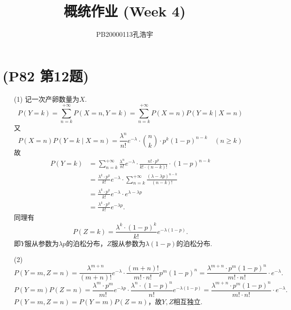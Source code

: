 \documentclass{article}
\title{概统作业 (Week 4)}
\author{PB20000113孔浩宇}
\begin{document}
\maketitle
\section{(P82 第12题)}  %
\begin{enumerate}
    \item [(1)]记一次产卵数量为$X$.
    \[
        P(Y=k) 
        =
        \sum\limits_{n=k}^{+\infty} P(X=n , Y=k) 
        =
        \sum\limits_{n=k}^{+\infty} P(X=n) P(Y=k \mid X=n)
    \]
    又
    \[
        P(X=n) P(Y=k \mid X=n)
        =
        \displaystyle{\frac{\lambda^n}{n!}} e^{-\lambda}\cdot
        \binom{n}{k} \cdot p^{k} {(1-p)}^{n-k}
        \quad (n\geq k)
    \]
    故
    \begin{align*}
        P(Y=k)
        &=
        \sum\limits_{n=k}^{+\infty} 
        \displaystyle{\frac{\lambda^n}{n!}} e^{-\lambda}\cdot
        \displaystyle{\frac{n!\cdot p^{k}}{k!\cdot {(n-k)!}}} \cdot  {(1-p)}^{n-k} \\
        &=
        \displaystyle{\frac{\lambda^k \cdot p^{k}}{k!}} e^{-\lambda}\cdot
        \sum\limits_{n=k}^{+\infty} 
        \displaystyle{\frac{{(\lambda -\lambda p)}^{n-k}}{{(n-k)!}}}  \\
        &=
        \displaystyle{\frac{\lambda^k \cdot p^{k}}{k!}} e^{-\lambda}\cdot
        e^{\lambda - \lambda p}\\
        &=
        \displaystyle{\frac{\lambda^k \cdot p^{k}}{k!}} e^{-\lambda p} .
    \end{align*}
    同理有
    \[
        P(Z=k)
        =
        \displaystyle{\frac{\lambda^k \cdot {(1-p)}^{k}}{k!}} e^{-\lambda (1-p)} .
    \]
    即$Y$服从参数为$\lambda p$的泊松分布，$Z$服从参数为$\lambda (1-p)$的泊松分布.
    \item [(2)]
    \[
        P(Y=m,Z=n) 
        =
        \displaystyle{\frac{\lambda^{m+n}}{(m+n)!}} e^{-\lambda}\cdot
        \frac{{(m+n)!}}{m!\cdot n!} p^{m} {(1-p)}^{n}
        =
        \frac{\lambda^{m+n}\cdot p^{m} {(1-p)}^{n} }{m!\cdot n!}\cdot e^{-\lambda} .
    \]
    \[
        P(Y=m) P(Z=n)
        =
        \frac{\lambda^m \cdot p^{m}}{m!} e^{-\lambda p} 
        \cdot 
        \frac{\lambda^n \cdot {(1-p)}^{n}}{n!} e^{-\lambda (1-p)}
        =
        \frac{\lambda^{m+n}\cdot p^{m} {(1-p)}^{n} }{m!\cdot n!}\cdot e^{-\lambda} .
    \]
    $P(Y=m,Z=n)=P(Y=m)P(Z=n)$，故$Y,Z$相互独立.
\end{enumerate}
\end{document}
